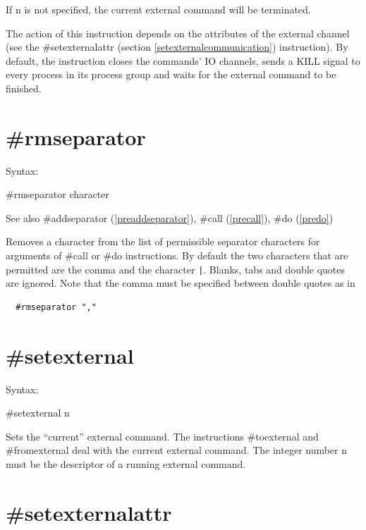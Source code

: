 If n is not specified, the current external command will be terminated.

The action of this instruction depends on the attributes of the external 
channel (see the \#setexternalattr (section 
\ref{setexternalcommunication}) instruction). By default, the instruction 
closes the commands' IO channels, sends a KILL signal to 
every process in its process group and waits for the external command to be 
finished.

 
\section{\#rmseparator}
\label{prermseparator}

\noindent Syntax:

\#rmseparator character
 
\noindent See also \#addseparator (\ref{preaddseparator}),
            \#call (\ref{precall}), \#do (\ref{predo})

\noindent Removes a character from the list of permissible 
separator characters for arguments of \#call or \#do instructions. By 
default the two characters that are permitted are the comma and the 
character \verb:|:. Blanks, tabs and double quotes are ignored. Note that 
the comma must be specified between double quotes as in
\begin{verbatim}
  #rmseparator ","
\end{verbatim}


\section{\#setexternal}
\label{presetexternal}

\noindent Syntax:

\#setexternal n

\noindent Sets the ``current'' external command. The 
instructions \#toexternal and 
\#fromexternal deal with the current external 
command.  The integer number n must be the descriptor of a running external 
command.


\section{\#setexternalattr}
\label{presetexternalattr}

